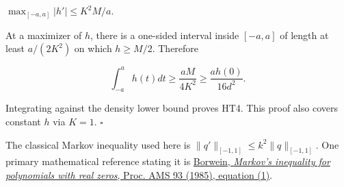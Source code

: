 \(\max_{[-a,a]}|h'| \le  K^2 M/a\).

At a maximizer of \(h\), there is a one-sided interval inside \([-a,a]\) of length at least \(a/(2K^2)\) on which \(h\ge M/2\). Therefore

\[
\int_{-a}^a h(t)dt\ge\frac{aM}{4K^2}
\ge\frac{a h(0)}{16d^2}.
\]

Integrating against the density lower bound proves HT4. This proof also covers constant \(h\) via \(K=1\). \(\square\)

The classical Markov inequality used here is \(\lVert q'\rVert_{[-1,1]}\le k^2\lVert q\rVert_{[-1,1]}\). One primary mathematical reference stating it is \href{https://wayback.cecm.sfu.ca/~pborwein/PAPERS/P27.pdf}{Borwein, \emph{Markov's inequality for polynomials with real zeros}, Proc. AMS 93 (1985), equation (1)}.
